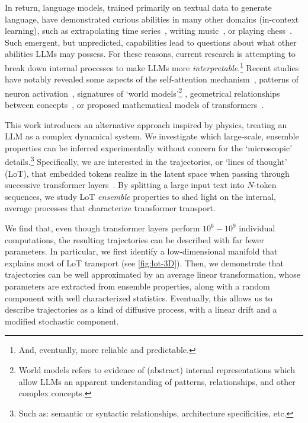 \documentclass{article} %
\newcommand{\nb}[1]{{\color{teal} NB: #1}} %
\begin{document}
In return, language models, trained primarily on textual data to generate language, have demonstrated curious abilities in many other domains (in-context learning), such as extrapolating time series~\citep{gruver2024largelanguagemodelszeroshot,liu2024llmslearngoverningprinciples}, writing music~\citep{zhou2024llmsreasonmusicevaluation}, or playing chess~\citep{ruoss2024grandmasterlevelchesssearch}. 
Such emergent, but unpredicted, capabilities lead to questions about what other abilities LLMs may possess.
For these reasons, current research is attempting to break down internal processes to make LLMs more \textit{interpretable}.\footnote{And, eventually, more reliable and predictable.}
Recent studies have notably revealed some aspects of the self-attention mechanism~\citep{vig2019visualizingattentiontransformerbasedlanguage}, patterns of neuron activation~\citep{bricken2023monosemanticity,templeton2024scaling}, signatures of `world models'\footnote{
World models refers to evidence of (abstract) internal representations which allow LLMs an apparent understanding of patterns, relationships, and other complex concepts.
}
\citep{gurnee2024languagemodelsrepresentspace,marks2024geometrytruthemergentlinear}, 
geometrical relationships between concepts~\citep{jiang2024originslinearrepresentationslarge}, or proposed mathematical models of transformers~\citep{geshkovski2024emergenceclustersselfattentiondynamics}. 

This work introduces an alternative approach inspired by physics, treating an LLM as a complex dynamical system.
We investigate which large-scale, ensemble properties can be inferred experimentally without concern for the `microscopic' details.\footnote{Such as: semantic or syntactic relationships, architecture specificities, etc.} Specifically, we are interested in the trajectories, or `lines of thought' (LoT), that embedded tokens realize in the latent space when passing through successive transformer layers~\citep{aubry2024transformeralignmentlargelanguage}. 
By splitting a large input text into $N$-token sequences, we study LoT \textit{ensemble} properties to shed light on the internal, average processes that characterize transformer transport.

We find that, even though transformer layers perform $10^6 - 10^9$ individual computations, the resulting trajectories can be described with far fewer parameters.
In particular, we first identify a low-dimensional manifold that explains most of LoT transport (see \cref{fig:lot-3D}).
Then, we demonstrate that trajectories can be well approximated by an average linear transformation, whose parameters are extracted from ensemble properties, along with a random component with well characterized statistics.
Eventually, this allows us to describe trajectories as a kind of diffusive process, with a linear drift and a modified stochastic component.
\end{document}
